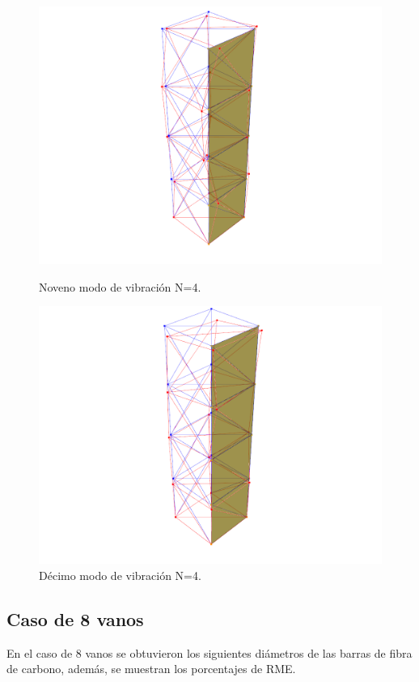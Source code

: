 \begin{figure}[H]
    \begin{minipage}[b]{0.5\textwidth}
        \centering
        \includegraphics[width=\textwidth]{FOTOS/mod9_4.png}
        \caption{Noveno modo de vibración N=4.}
    \end{minipage}
    \hfill
    \begin{minipage}[b]{0.5\textwidth}
        \centering
        \includegraphics[width=\textwidth]{FOTOS/mod10_4.png}
        \caption{Décimo modo de vibración N=4.}
    \end{minipage}
\end{figure}

\subsection{Caso de 8 vanos}
En el caso de 8 vanos se obtuvieron los siguientes diámetros de las barras de fibra de carbono, además, se muestran los porcentajes de RME.

